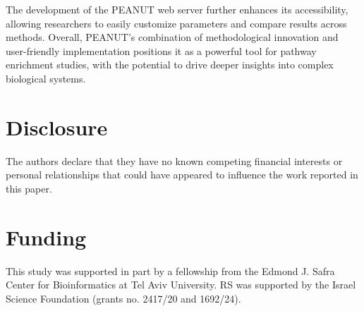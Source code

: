 \documentclass{article}
\begin{document}
The development of the PEANUT web server further enhances its accessibility, allowing researchers to easily customize parameters and compare results across methods. Overall, PEANUT's combination of methodological innovation and user-friendly implementation positions it as a powerful tool for pathway enrichment studies, with the potential to drive deeper insights into complex biological systems.


\section*{Disclosure}
The authors declare that they have no known competing financial interests or personal relationships that could have appeared to influence the work reported in this paper.

\section*{Funding}
This study was supported in part by a fellowship from the Edmond J. Safra Center for Bioinformatics at Tel Aviv University. 
RS was supported by the Israel Science Foundation (grants no. 2417/20 and 1692/24).
\end{document}
